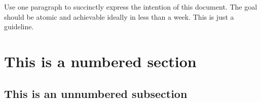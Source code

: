 Use one paragraph to succinctly express the intention of this document. The goal should be atomic and achievable ideally in less than a week. This is just a guideline. 
\section{This is a numbered section}
\subsection*{This is an unnumbered subsection}
\lipsum[1]